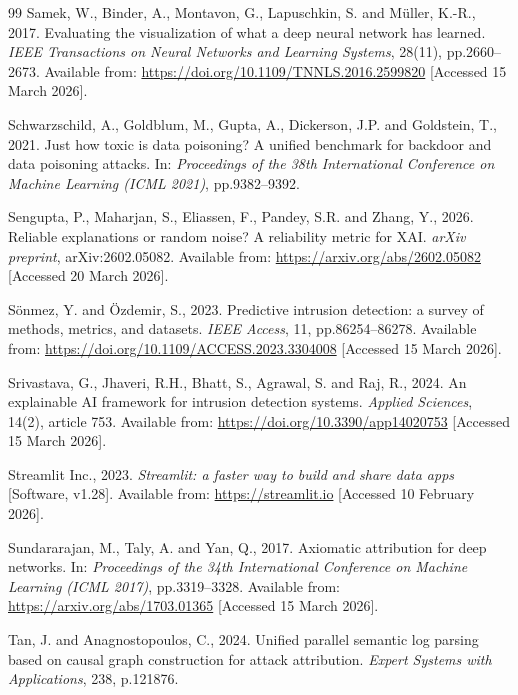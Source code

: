 \documentclass[12pt,a4paper]{report}
\begin{document}
\begin{thebibliography}{99}
Samek, W., Binder, A., Montavon, G., Lapuschkin, S. and M\"{u}ller, K.-R., 2017. Evaluating the visualization of what a deep neural network has learned. \textit{IEEE Transactions on Neural Networks and Learning Systems}, 28(11), pp.2660--2673. Available from: \url{https://doi.org/10.1109/TNNLS.2016.2599820} [Accessed 15 March 2026].

Schwarzschild, A., Goldblum, M., Gupta, A., Dickerson, J.P. and Goldstein, T., 2021. Just how toxic is data poisoning? A unified benchmark for backdoor and data poisoning attacks. In: \textit{Proceedings of the 38th International Conference on Machine Learning (ICML 2021)}, pp.9382--9392.

Sengupta, P., Maharjan, S., Eliassen, F., Pandey, S.R. and Zhang, Y., 2026. Reliable explanations or random noise? A reliability metric for XAI. \textit{arXiv preprint}, arXiv:2602.05082. Available from: \url{https://arxiv.org/abs/2602.05082} [Accessed 20 March 2026].

S\"{o}nmez, Y. and \"{O}zdemir, S., 2023. Predictive intrusion detection: a survey of methods, metrics, and datasets. \textit{IEEE Access}, 11, pp.86254--86278. Available from: \url{https://doi.org/10.1109/ACCESS.2023.3304008} [Accessed 15 March 2026].

Srivastava, G., Jhaveri, R.H., Bhatt, S., Agrawal, S. and Raj, R., 2024. An explainable AI framework for intrusion detection systems. \textit{Applied Sciences}, 14(2), article 753. Available from: \url{https://doi.org/10.3390/app14020753} [Accessed 15 March 2026].

Streamlit Inc., 2023. \textit{Streamlit: a faster way to build and share data apps} [Software, v1.28]. Available from: \url{https://streamlit.io} [Accessed 10 February 2026].

Sundararajan, M., Taly, A. and Yan, Q., 2017. Axiomatic attribution for deep networks. In: \textit{Proceedings of the 34th International Conference on Machine Learning (ICML 2017)}, pp.3319--3328. Available from: \url{https://arxiv.org/abs/1703.01365} [Accessed 15 March 2026].

Tan, J. and Anagnostopoulos, C., 2024. Unified parallel semantic log parsing based on causal graph construction for attack attribution. \textit{Expert Systems with Applications}, 238, p.121876.


\end{thebibliography}
\end{document}
